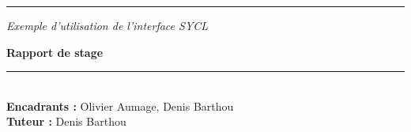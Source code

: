 \begin{titlepage}

  \begin{center}
    \begin{figure}[!htbp]
      \begin{center}
        \begin{minipage}{0.4\linewidth}
        \end{minipage}
        \hfill
        \begin{minipage}{0.4\linewidth}
        \end{minipage}
      \end{center}
    \end{figure}
  \end{center}

  \vspace{1cm}
  \hrule
  \begin{flushleft}
    \Huge{\textit{Exemple d'utilisation de l'interface SYCL}}\\
  \end{flushleft}
  \begin{flushright}
    \huge\textbf{Rapport de stage}\\
  \end{flushright}
  \hrule

  \vspace{1cm}
  \\
  \vspace{1cm}
  \large{\textbf{Encadrants :} Olivier Aumage, Denis Barthou}\\
  \large{\textbf{Tuteur :} Denis Barthou}
  \vspace{1cm}


  \vspace{1cm}

  \begin{center}
    \begin{figure}[!htbp]
      \begin{center}
        \begin{minipage}{0.4\linewidth}
        \end{minipage}
        \hfill
        \begin{minipage}{0.4\linewidth}
        \end{minipage}
      \end{center}
    \end{figure}
  \end{center}

\end{titlepage}
